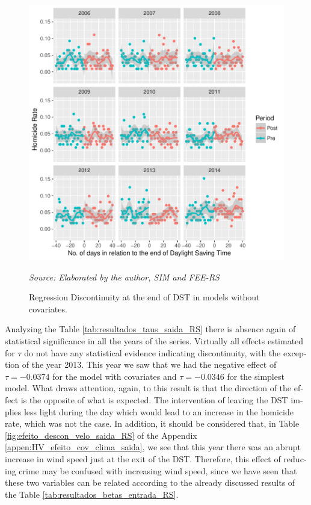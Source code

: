 \documentclass[12pt,openright,oneside,a4paper,english,french,spanish]{abntex2}
\numberwithin{table}{section} %
\numberwithin{figure}{section} %
\newcommand{\source}[1]{\textit{#1}}
\begin{document}
\begin{otherlanguage}{english}
\begin{figure}[H]
\begin{center}
\includegraphics{TESE_DE_DOUTORADO_RENAN_FINAL-plot_resultados_rdd_saidaHV_RS}
\end{center}
\caption{Regression Discontinuity at the end of DST in models without covariates.}
\source{Source: Elaborated by the author, SIM and FEE-RS}
\label{fig:resultado_rdd_saida}
\end{figure}



Analyzing the Table \ref{tab:resultados_taus_saida_RS} there is absence again of statistical significance in all the years of the series. Virtually all effects estimated for $\tau$ do not have any statistical evidence indicating discontinuity, with the exception of the year 2013. This year we saw that we had the negative effect of $\tau = -0.0374$ for the model with covariates and $\tau = -0.0346$ for the simplest model. What draws attention, again, to this result is that the direction of the effect is the opposite of what is expected. The intervention of leaving the DST implies less light during the day which would lead to an increase in the homicide rate, which was not the case. In addition, it should be considered that, in Table \ref{fig:efeito_descon_velo_saida_RS} of the Appendix \ref{appen:HV_efeito_cov_clima_saida}, we see that this year there was an abrupt increase in wind speed just at the exit of the DST. Therefore, this effect of reducing crime may be confused with increasing wind speed, since we have seen that these two variables can be related according to the already discussed results of the Table \ref{tab:resultados_betas_entrada_RS}.



\end{otherlanguage}
\end{document}
